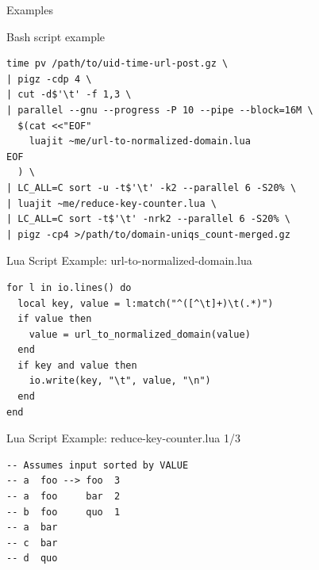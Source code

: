 \documentclass[handout]{beamer}
\begin{document}

\begin{frame}
\huge Examples
\end{frame}


\begin{frame}[fragile]{Bash script example}

\begin{verbatim}
time pv /path/to/uid-time-url-post.gz \
| pigz -cdp 4 \
| cut -d$'\t' -f 1,3 \
| parallel --gnu --progress -P 10 --pipe --block=16M \
  $(cat <<"EOF"
    luajit ~me/url-to-normalized-domain.lua
EOF
  ) \
| LC_ALL=C sort -u -t$'\t' -k2 --parallel 6 -S20% \
| luajit ~me/reduce-key-counter.lua \
| LC_ALL=C sort -t$'\t' -nrk2 --parallel 6 -S20% \
| pigz -cp4 >/path/to/domain-uniqs_count-merged.gz
\end{verbatim}

\end{frame}


\begin{frame}[fragile]{Lua Script Example: url-to-normalized-domain.lua}

\begin{verbatim}
for l in io.lines() do
  local key, value = l:match("^([^\t]+)\t(.*)")
  if value then
    value = url_to_normalized_domain(value)
  end
  if key and value then
    io.write(key, "\t", value, "\n")
  end
end
\end{verbatim}

\end{frame}


\begin{frame}[fragile]{Lua Script Example: reduce-key-counter.lua 1/3}

\begin{verbatim}
-- Assumes input sorted by VALUE
-- a  foo --> foo  3
-- a  foo     bar  2
-- b  foo     quo  1
-- a  bar
-- c  bar
-- d  quo
\end{verbatim}

\end{frame}

\end{document}
